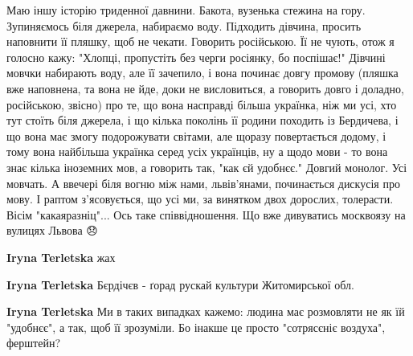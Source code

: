 \begin{itemize}
Маю іншу історію триденної давнини. Бакота, вузенька стежина на гору.
Зупиняємось біля джерела, набираємо воду. Підходить дівчина, просить наповнити
її пляшку, щоб не чекати. Говорить російською. Її не чують, отож я голосно
кажу: "Хлопці, пропустіть без черги росіянку, бо поспішає!" Дівчині мовчки
набирають воду, але її зачепило, і вона починає довгу промову (пляшка вже
наповнена, та вона не йде, доки не висловиться, а говорить довго і доладно,
російською, звісно) про те, що вона насправді більша українка, ніж ми усі, хто
тут стоїть біля джерела, і що кілька поколінь її родини походить із Бердичева,
і що вона має змогу подорожувати світами, але щоразу повертається додому, і
тому вона найбільша українка серед усіх українців, ну а щодо мови - то вона
знає кілька іноземних мов, а говорить так, "как єй удобнєє." Довгий монолог.
Усі мовчать. А ввечері біля вогню між нами, львів'янами, починається дискусія
про мову. І раптом з'ясовується, що усі ми, за винятком двох дорослих,
толерасти. Вісім "какаяразніц"... Ось таке співвідношення. Що вже дивуватись
москвоязу на вулицях Львова 😞

\begin{itemize}
 
\textbf{Iryna Terletska} жах

 
\textbf{Iryna Terletska} Бєрдічєв - ґорад рускай культури Житомирської обл.

 
\textbf{Iryna Terletska} Ми в таких випадках кажемо: людина має розмовляти не
як їй "удобнєє", а так, щоб її зрозуміли. Бо інакше це просто "сотрясєніє
воздуха", ферштейн?
\end{itemize}

 

\end{itemize}
